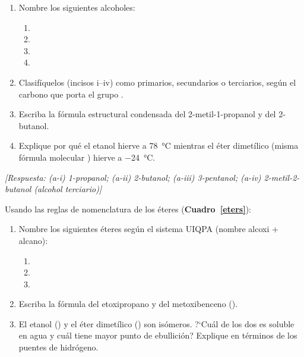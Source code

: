 \begin{bloque_ejercicios}
\begin{ejercicios}
\begin{enumerate}[label=\alph*)]
    \item Nombre los siguientes alcoholes:
          \begin{enumerate}[label=\roman*)]
              \item {}
              \item {}
              \item {}
              \item {}
          \end{enumerate}
    \item Clasif\'iquelos (incisos i--iv) como primarios,
          secundarios o terciarios, seg\'un el carbono que porta el
          grupo .
    \item Escriba la f\'ormula estructural condensada del
          2-metil-1-propanol y del 2-butanol.
    \item Explique por qu\'e el etanol hierve a \SI{78}{\celsius}
          mientras el \'eter dimet\'ilico (misma f\'ormula molecular
          ) hierve a \SI{-24}{\celsius}.
\end{enumerate}

\textit{[Respuesta: (a-i) 1-propanol;
(a-ii) 2-butanol;
(a-iii) 3-pentanol;
(a-iv) 2-metil-2-butanol (alcohol terciario)]}

\item Usando las reglas de nomenclatura de los \'eteres
(\textbf{Cuadro~\ref{eters}}):

\begin{enumerate}[label=\alph*)]
    \item Nombre los siguientes \'eteres seg\'un el sistema UIQPA
          (nombre alcoxi + alcano):
          \begin{enumerate}[label=\roman*)]
              \item {}
              \item {}
              \item {}
          \end{enumerate}
    \item Escriba la f\'ormula del etoxipropano y del
          metoxibenceno ().
    \item El etanol () y el \'eter dimet\'ilico
          () son is\'omeros. ?`Cu\'al de los dos
          es soluble en agua y cu\'al tiene mayor punto de
          ebullici\'on? Explique en t\'erminos de los puentes
          de hidr\'ogeno.
\end{enumerate}


\end{ejercicios}
\end{bloque_ejercicios}
